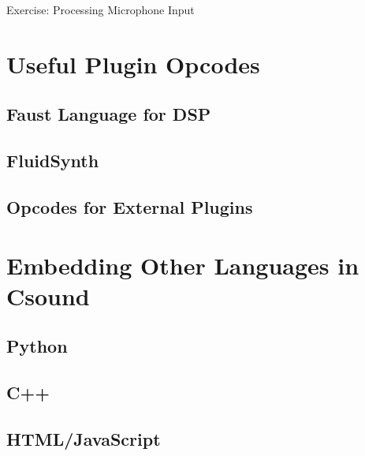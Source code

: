 \documentclass{beamer}
\begin{document}
        \begin{frame}{Exercise: Processing Microphone Input}
        \end{frame}
        
        \section{Useful Plugin Opcodes}
        \subsection{Faust Language for DSP}
        \subsection{FluidSynth}
        \subsection{Opcodes for External Plugins}
        \section{Embedding Other Languages in Csound}
        \subsection{Python}
        \subsection{C++}
        \subsection{HTML/JavaScript}
        
        
        
\end{document}
